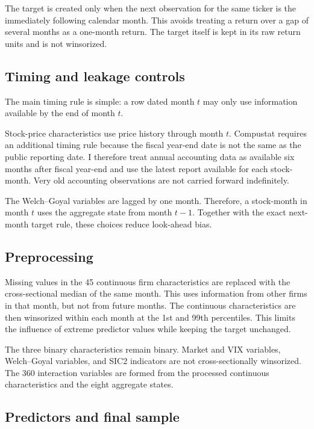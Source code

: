 \documentclass[11pt,a4paper]{article}
\begin{document}
The target is created only when the next observation for the same ticker is the
immediately following calendar month. This avoids treating a return over a gap
of several months as a one-month return. The target itself is kept in its raw
return units and is not winsorized.

\subsection{Timing and leakage controls}

The main timing rule is simple: a row dated month \(t\) may only use information
available by the end of month \(t\).

Stock-price characteristics use price history through month \(t\). Compustat
requires an additional timing rule because the fiscal year-end date is not the
same as the public reporting date. I therefore treat annual accounting data as
available six months after fiscal year-end and use the latest report available
for each stock-month. Very old accounting observations are not carried forward
indefinitely.

The Welch--Goyal variables are lagged by one month. Therefore, a stock-month in
month \(t\) uses the aggregate state from month \(t-1\). Together with the
exact next-month target rule, these choices reduce look-ahead bias.

\subsection{Preprocessing}

Missing values in the 45 continuous firm characteristics are replaced with the
cross-sectional median of the same month. This uses information from other
firms in that month, but not from future months. The continuous characteristics
are then winsorized within each month at the 1st and 99th percentiles. This
limits the influence of extreme predictor values while keeping the target
unchanged.

The three binary characteristics remain binary. Market and VIX variables,
Welch--Goyal variables, and SIC2 indicators are not cross-sectionally
winsorized. The 360 interaction variables are formed from the processed
continuous characteristics and the eight aggregate states.

\subsection{Predictors and final sample}
\end{document}
